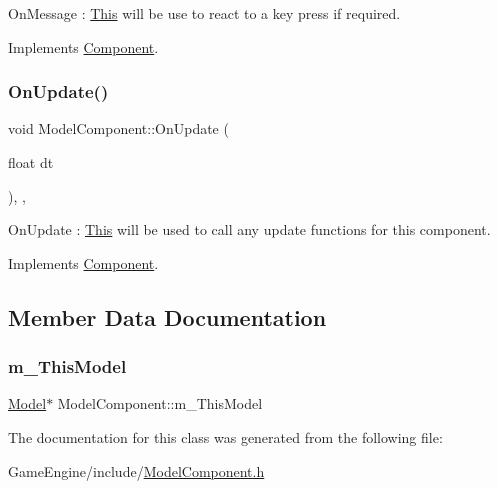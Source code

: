 On\+Message \+: \mbox{\hyperlink{class_this}{This}} will be use to react to a key press if required. 

Implements \mbox{\hyperlink{class_component_a1a880fe5e212cd7ef8241e220660417d}{Component}}.

\mbox{\label{class_model_component_a5def59776319943854fb5da3dc515051}} 
\subsubsection{\texorpdfstring{On\+Update()}{OnUpdate()}}
{\footnotesize\ttfamily void Model\+Component\+::\+On\+Update (\begin{DoxyParamCaption}\item[{float}]{dt }\end{DoxyParamCaption})\hspace{0.3cm}{\ttfamily [inline]}, {\ttfamily [override]}, {\ttfamily [virtual]}}

On\+Update \+: \mbox{\hyperlink{class_this}{This}} will be used to call any update functions for this component. 

Implements \mbox{\hyperlink{class_component_ab71d7f4b6d8792287a9b0c9e045acbe0}{Component}}.



\subsection{Member Data Documentation}
\mbox{\label{class_model_component_afff2101b1cdbf6a8339fa151bcc8b6e0}} 
\subsubsection{\texorpdfstring{m\+\_\+\+This\+Model}{m\_ThisModel}}
{\footnotesize\ttfamily \mbox{\hyperlink{class_model}{Model}}$\ast$ Model\+Component\+::m\+\_\+\+This\+Model}



The documentation for this class was generated from the following file\+:\begin{DoxyCompactItemize}
\item 
Game\+Engine/include/\mbox{\hyperlink{_model_component_8h}{Model\+Component.\+h}}\end{DoxyCompactItemize}
